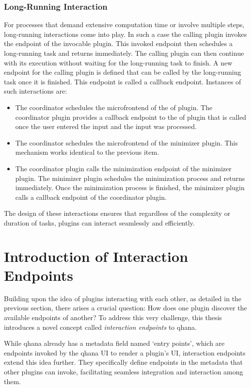 \documentclass[
  a4paper,  %
  twoside,  %
  bibliography=totoc,
  headsepline,
  cleardoublepage=empty,
  parskip=half,
  draft=false
]{scrbook}
\begin{document}
\subsubsection{Long-Running Interaction}

For processes that demand extensive computation time or involve multiple steps, long-running interactions come into play.
In such a case the calling plugin invokes the endpoint of the invocable plugin.
This invoked endpoint then schedules a long-running task and returns immediately.
The calling plugin can then continue with its execution without waiting for the long-running task to finish.
A new endpoint for the calling plugin is defined that can be called by the long-running task once it is finished.
This endpoint is called a callback endpoint.
Instances of such interactions are:
\begin{itemize}
    \item The coordinator schedules the microfrontend of the \gls{of} plugin.
    The coordinator plugin provides a callback endpoint to the \gls{of} plugin that is called once the user entered the input and the input was processed.
    \item The coordinator schedules the microfrontend of the minimizer plugin.
    This mechanism works identical to the previous item.
    \item The coordinator plugin calls the minimization endpoint of the minimizer plugin.
    The minimizer plugin schedules the minimization process and returns immediately.
    Once the minimization process is finished, the minimizer plugin calls a callback endpoint of the coordinator plugin.
\end{itemize}
The design of these interactions ensures that regardless of the complexity or duration of tasks, plugins can interact seamlessly and efficiently.

\section{Introduction of Interaction Endpoints}
\label{sec:introie}

Building upon the idea of plugins interacting with each other, as detailed in the previous section, there arises a crucial question:
How does one plugin discover the available endpoints of another?
To address this very challenge, this thesis introduces a novel concept called \textit{interaction endpoints} to \gls{qhana}.

While \gls{qhana} already has a metadata field named `entry points', which are endpoints invoked by the \gls{qhana} UI to render a plugin's UI, interaction endpoints extend this idea further.
They specifically define endpoints in the metadata that other plugins can invoke, facilitating seamless integration and interaction among them.
\end{document}
